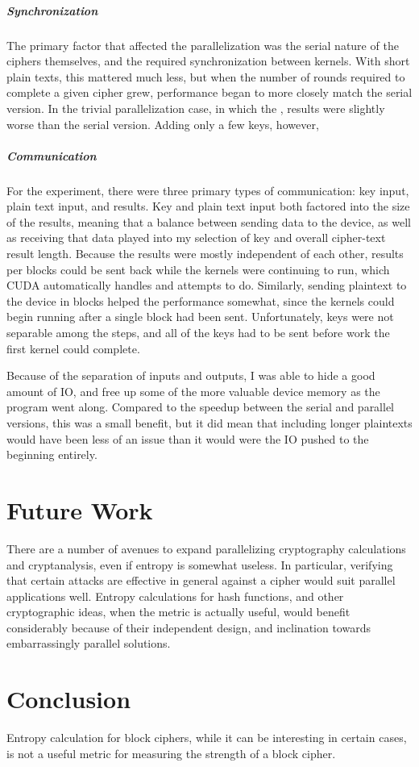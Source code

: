 \documentclass[11.5pt]{article}
\begin{document}
\subparagraph*{Synchronization}
The primary factor that affected the parallelization was the serial nature of the ciphers themselves, and the required synchronization between kernels. With short plain texts, this mattered much less, but when the number of rounds required to complete a given cipher grew, performance began to more closely match the serial version. In the trivial parallelization case, in which the , results were slightly worse than the serial version. Adding only a few keys, however, 
\subparagraph*{Communication}
For the experiment, there were three primary types of communication: key input, plain text input, and results. Key and plain text input both factored into the size of the results, meaning that a balance between sending data to the device, as well as receiving that data played into my selection of key and overall cipher-text result length. Because the results were mostly independent of each other, results per blocks could be sent back while the kernels were continuing to run, which CUDA automatically handles and attempts to do. Similarly, sending plaintext to the device in blocks helped the performance somewhat, since the kernels could begin running after a single block had been sent. Unfortunately, keys were not separable among the steps, and all of the keys had to be sent before work the first kernel could complete.

Because of the separation of inputs and outputs, I was able to hide a good amount of IO, and free up some of the more valuable device memory as the program went along. Compared to the speedup between the serial and parallel versions, this was a small benefit, but it did mean that including longer plaintexts would have been less of an issue than it would were the IO pushed to the beginning entirely.

\section{Future Work}
There are a number of avenues to expand parallelizing cryptography calculations and cryptanalysis, even if entropy is somewhat useless. In particular, verifying that certain attacks are effective in general against a cipher would suit parallel applications well. Entropy calculations for hash functions, and other cryptographic ideas, when the metric is actually useful, would benefit considerably because of their independent design, and inclination towards embarrassingly parallel solutions.

\section{Conclusion}
Entropy calculation for block ciphers, while it can be interesting in certain cases, is not a useful metric for measuring the strength of a block cipher. 
\end{document}

